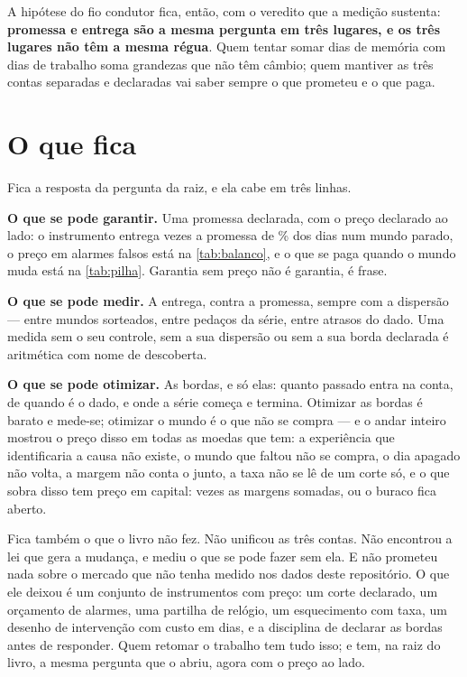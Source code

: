 A hipótese do fio condutor fica, então, com o veredito que a medição sustenta: \textbf{promessa e entrega
são a mesma pergunta em três lugares, e os três lugares não têm a mesma régua}. Quem tentar somar
dias de memória com dias de trabalho soma grandezas que não têm câmbio; quem mantiver as três
contas separadas e declaradas vai saber sempre o que prometeu e o que paga.

\section{O que fica}

Fica a resposta da pergunta da raiz, e ela cabe em três linhas.

\textbf{O que se pode garantir.} Uma promessa declarada, com o preço declarado ao lado: o instrumento
entrega \numFechoParadoLongaSemAtraso{} vezes a promessa de \numPromessaPct{}\% dos dias num mundo parado, o preço em alarmes falsos está na
\cref{tab:balanco}, e o que se paga quando o mundo muda está na \cref{tab:pilha}. Garantia sem preço
não é garantia, é frase.

\textbf{O que se pode medir.} A entrega, contra a promessa, sempre com a dispersão --- entre mundos
sorteados, entre pedaços da série, entre atrasos do dado. Uma medida sem o seu controle, sem a sua
dispersão ou sem a sua borda declarada é aritmética com nome de descoberta.

\textbf{O que se pode otimizar.} As bordas, e só elas: quanto passado entra na conta, de quando é o dado,
e onde a série começa e termina. Otimizar as bordas é barato e mede-se; otimizar o mundo é o que não
se compra --- e o andar inteiro mostrou o preço disso em todas as moedas que tem: a experiência que
identificaria a causa não existe, o mundo que faltou não se compra, o dia apagado não volta, a margem não
conta o junto, a taxa não se lê de um corte só, e o que sobra disso tem preço em capital:
\numPrecoRazao{} vezes as margens somadas, ou o buraco fica aberto.

Fica também o que o livro não fez. Não unificou as três contas. Não encontrou a lei que gera a
mudança, e mediu o que se pode fazer sem ela. E não prometeu nada sobre o mercado que não tenha
medido nos dados deste repositório. O que ele deixou é um conjunto de instrumentos com
preço: um corte declarado, um orçamento de alarmes, uma partilha de relógio, um esquecimento com
taxa, um desenho de intervenção com custo em dias, e a disciplina de declarar as bordas antes de
responder. Quem retomar o trabalho tem tudo isso; e tem, na raiz do livro, a mesma pergunta que o
abriu, agora com o preço ao lado.
